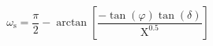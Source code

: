 \documentclass[12pt]{article}
\begin{document}
\begin{displaymath}
\omega_{\mathrm{s}}=\frac{\pi}{2}-\arctan \left[\frac{-\tan (\varphi) \tan (\delta)}{\mathrm{X}^{0.5}}\right]
\end{displaymath}
\end{document}
